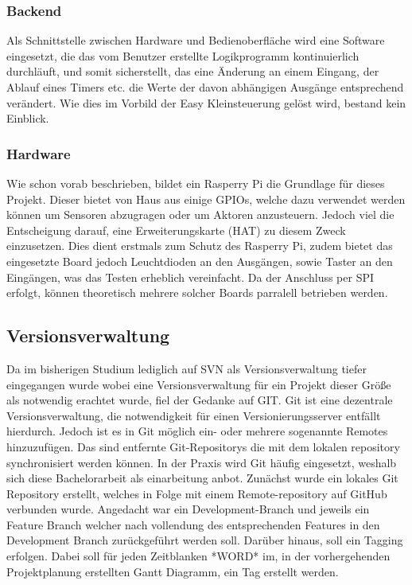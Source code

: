\subsubsection{Backend} 
Als Schnittstelle zwischen Hardware und Bedienoberfläche wird eine Software eingesetzt, die das vom Benutzer erstellte Logikprogramm kontinuierlich durchläuft, und somit sicherstellt, das eine Änderung an einem Eingang, der Ablauf eines Timers etc. die Werte der davon abhängigen Ausgänge entsprechend verändert. Wie dies im Vorbild der Easy Kleinsteuerung gelöst wird, bestand kein Einblick.  

\subsubsection{Hardware} 
Wie schon vorab beschrieben, bildet ein Rasperry Pi die Grundlage für dieses Projekt. Dieser bietet von Haus aus einige GPIOs, welche  dazu  verwendet werden können um Sensoren abzugragen oder um Aktoren anzusteuern. Jedoch viel die Entscheigung darauf, eine Erweiterungskarte (HAT) zu diesem Zweck einzusetzen. Dies dient erstmals zum Schutz des Rasperry Pi, zudem bietet das eingesetzte Board jedoch Leuchtdioden an den Ausgängen, sowie Taster an den Eingängen, was das Testen erheblich vereinfacht. Da der Anschluss per SPI erfolgt, können theoretisch mehrere solcher Boards parralell betrieben werden. 

\subsection{Versionsverwaltung}
Da im bisherigen Studium lediglich auf SVN als Versionsverwaltung tiefer eingegangen wurde wobei eine Versionsverwaltung für ein Projekt dieser Größe als notwendig erachtet wurde, fiel der Gedanke auf GIT. Git ist eine dezentrale Versionsverwaltung, die notwendigkeit für einen Versionierungsserver entfällt hierdurch. Jedoch ist es in Git möglich ein- oder mehrere sogenannte Remotes hinzuzufügen. Das sind entfernte Git-Repositorys die mit dem lokalen repository synchronisiert werden können. In der Praxis wird Git häufig eingesetzt, weshalb sich diese Bachelorarbeit als einarbeitung anbot. Zunächst wurde ein lokales Git Repository erstellt, welches in Folge mit einem Remote-repository auf GitHub verbunden wurde. Angedacht war ein Development-Branch und jeweils ein Feature Branch welcher nach vollendung des entsprechenden Features in den Development Branch zurückgeführt werden soll. Darüber hinaus, soll ein Tagging erfolgen. Dabei soll für jeden Zeitblanken *WORD* im, in der vorhergehenden Projektplanung erstellten Gantt Diagramm, ein Tag erstellt werden. 


    
\clearpage
